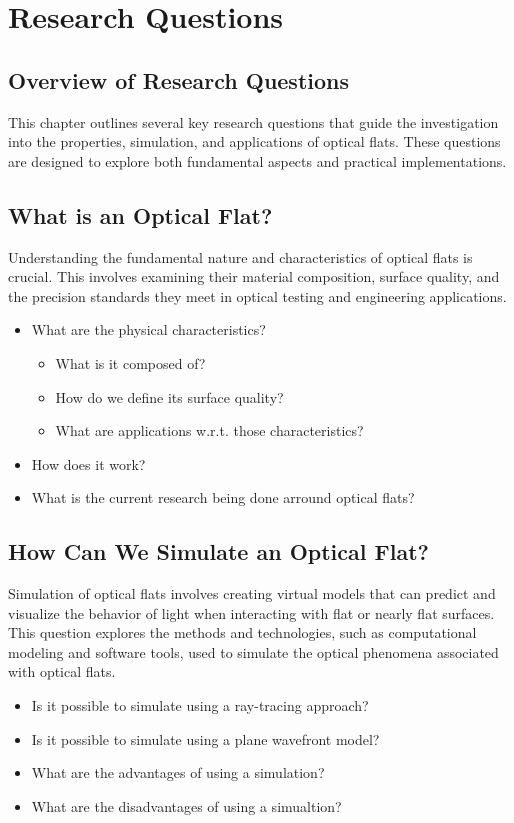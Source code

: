 \documentclass[../main.tex]{subfiles}
\begin{document}
\chapter{Research Questions}

\section{Overview of Research Questions}
This chapter outlines several key research questions that guide the investigation into the properties, simulation, and applications of optical flats. These questions are designed to explore both fundamental aspects and practical implementations.

\section{What is an Optical Flat?}
Understanding the fundamental nature and characteristics of optical flats is crucial. This involves examining their material composition, surface quality, and the precision standards they meet in optical testing and engineering applications.
\begin{itemize}
    \item What are the physical characteristics?
    \begin{itemize}
        \item What is it composed of?
        \item How do we define its surface quality?
        \item What are applications w.r.t. those characteristics?
    \end{itemize}
    \item How does it work?
    \item What is the current research being done arround optical flats?
\end{itemize}

\section{How Can We Simulate an Optical Flat?}
Simulation of optical flats involves creating virtual models that can predict and visualize the behavior of light when interacting with flat or nearly flat surfaces. This question explores the methods and technologies, such as computational modeling and software tools, used to simulate the optical phenomena associated with optical flats.
\begin{itemize}
    \item Is it possible to simulate using a ray-tracing approach?
    \item Is it possible to simulate using a plane wavefront model? 
    \item What are the advantages of using a simulation?
    \item What are the disadvantages of using a simualtion?
\end{itemize}
\end{document}
